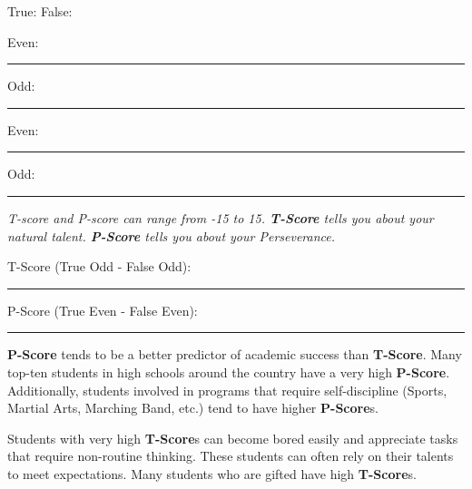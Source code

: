 \documentclass[letterpaper, 12pt]{article}
\begin{document}
\vspace{.5in}
True: \hspace{4in} False:

Even: \rule{0.5in}{0.01in} Odd: \rule{0.5in}{0.01in} \hspace{2.45in} Even: \rule{0.5in}{0.01in} Odd: \rule{0.5in}{0.01in}
\vspace{.5in}

\begin{center}
\textit{T-score and P-score can range from -15 to 15.  \textbf{T-Score} tells you about your natural talent. \textbf{P-Score} tells you about your Perseverance.}
\end{center}


T-Score (True Odd - False Odd): \rule{0.5in}{0.01in}

\vspace{.5in}
P-Score (True Even - False Even): \rule{0.5in}{0.01in}
\vspace{.25in}

\textbf{P-Score} tends to be a better predictor of academic success than \textbf{T-Score}.  Many top-ten students in high schools around the country have a very high \textbf{P-Score}.  Additionally, students involved in programs that require self-discipline (Sports, Martial Arts, Marching Band, etc.) tend to have higher \textbf{P-Score}s.  

Students with very high \textbf{T-Score}s can become bored easily and appreciate tasks that require non-routine thinking.  These students can often rely on their talents to meet expectations. Many students who are gifted have high \textbf{T-Score}s.
\end{document}
